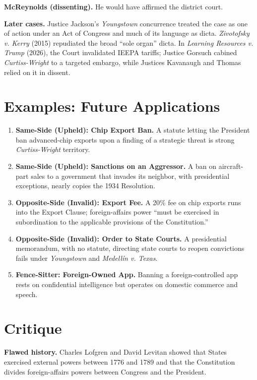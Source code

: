 \documentclass[12pt]{article}
\begin{document}
\textbf{McReynolds (dissenting).} He would have affirmed the district court.

\textbf{Later cases.} Justice Jackson's \textit{Youngstown} concurrence treated the case as one of action under an Act of Congress and much of its language as dicta. \textit{Zivotofsky v. Kerry} (2015) repudiated the broad ``sole organ'' dicta. In \textit{Learning Resources v. Trump} (2026), the Court invalidated IEEPA tariffs; Justice Gorsuch cabined \textit{Curtiss-Wright} to a targeted embargo, while Justices Kavanaugh and Thomas relied on it in dissent.

\section{Examples: Future Applications}

\begin{enumerate}
\item \textbf{Same-Side (Upheld): Chip Export Ban.} A statute letting the President ban advanced-chip exports upon a finding of a strategic threat is strong \textit{Curtiss-Wright} territory.
\item \textbf{Same-Side (Upheld): Sanctions on an Aggressor.} A ban on aircraft-part sales to a government that invades its neighbor, with presidential exceptions, nearly copies the 1934 Resolution.
\item \textbf{Opposite-Side (Invalid): Export Fee.} A 20\% fee on chip exports runs into the Export Clause; foreign-affairs power ``must be exercised in subordination to the applicable provisions of the Constitution.''
\item \textbf{Opposite-Side (Invalid): Order to State Courts.} A presidential memorandum, with no statute, directing state courts to reopen convictions fails under \textit{Youngstown} and \textit{Medell\'in v. Texas}.
\item \textbf{Fence-Sitter: Foreign-Owned App.} Banning a foreign-controlled app rests on confidential intelligence but operates on domestic commerce and speech.
\end{enumerate}

\section{Critique}

\textbf{Flawed history.} Charles Lofgren and David Levitan showed that States exercised external powers between 1776 and 1789 and that the Constitution divides foreign-affairs powers between Congress and the President.
\end{document}
